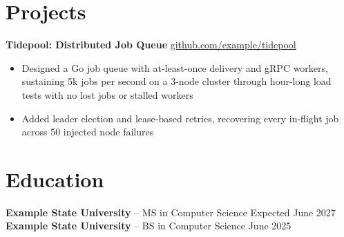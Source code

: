 \documentclass[11pt]{article}       %
\begin{document}
\vspace{-18.5pt}

\section*{Projects}
\textbf{Tidepool: Distributed Job Queue} \hfill \href{https://github.com/example/tidepool}{github.com/example/tidepool} \\
\vspace{-9pt}
\begin{itemize}
  \item Designed a Go job queue with at-least-once delivery and gRPC workers, sustaining 5k jobs per second on a 3-node cluster through hour-long load tests with no lost jobs or stalled workers
  \item Added leader election and lease-based retries, recovering every in-flight job across 50 injected node failures
\end{itemize}

\vspace{-18.5pt}

\section*{Education}
\textbf{Example State University} -- MS in Computer Science \hfill Expected June 2027 \\
\textbf{Example State University} -- BS in Computer Science \hfill June 2025
\end{document}
